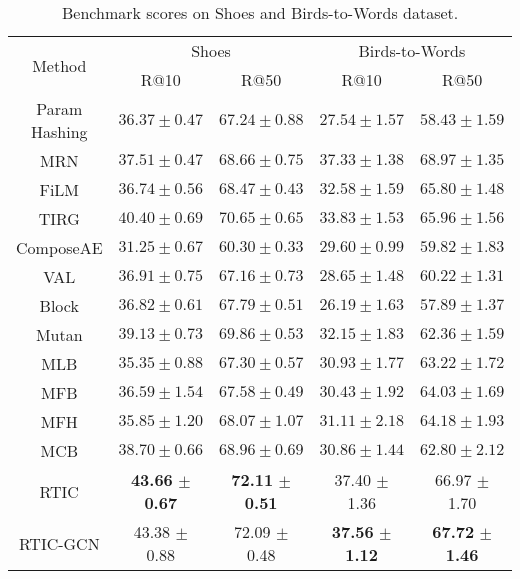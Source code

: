 \documentclass[10pt,twocolumn,letterpaper]{article}
\begin{document}
    
\begin{table}[h]
    \caption{Benchmark scores on Shoes and Birds-to-Words dataset.}
    \centering
    \begin{adjustbox}{width=0.48\textwidth}
    \begin{tabular}{ccccc}
        \toprule
        \multirow{2}{*}{Method} & \multicolumn{2}{c}{Shoes} & \multicolumn{2}{c}{Birds-to-Words} \\ \cline{2-5}
        & R@10 & R@50 & R@10 & R@50 \\
        \hline \hline
        Param Hashing & $ 36.37 \pm  0.47 $ & $ 67.24 \pm 0.88 $ & $ 27.54 \pm 1.57 $ & $ 58.43 \pm 1.59 $ \\
        MRN & $ 37.51 \pm 0.47 $ & $ 68.66 \pm 0.75 $ & $ 37.33 \pm 1.38 $ & $ 68.97 \pm 1.35 $ \\
        FiLM & $ 36.74 \pm 0.56 $ & $ 68.47 \pm 0.43 $ & $ 32.58 \pm 1.59 $ & $ 65.80 \pm 1.48 $ \\
        TIRG & $40.40 \pm 0.69$ & $70.65 \pm 0.65$ & $ 33.83 \pm 1.53 $ & $ 65.96 \pm 1.56 $ \\
        ComposeAE & $ 31.25 \pm 0.67 $ & $ 60.30 \pm 0.33 $ & $ 29.60 \pm 0.99 $ & $ 59.82 \pm 1.83 $ \\
        VAL & $ 36.91 \pm 0.75 $ & $ 67.16 \pm 0.73 $ & $ 28.65 \pm 1.48 $ & $ 60.22 \pm 1.31 $ \\
        \hline
        Block & $ 36.82 \pm 0.61 $ & $ 67.79 \pm 0.51 $ & $ 26.19 \pm 1.63 $ & $ 57.89 \pm 1.37 $ \\
        Mutan & $ 39.13 \pm 0.73 $ & $ 69.86 \pm 0.53 $ & $ 32.15 \pm 1.83 $ & $ 62.36 \pm 1.59 $ \\
        MLB & $ 35.35 \pm 0.88 $ & $ 67.30 \pm 0.57 $ & $ 30.93 \pm 1.77 $ & $ 63.22 \pm 1.72 $ \\
        MFB & $ 36.59 \pm 1.54 $ & $ 67.58 \pm 0.49 $ & $ 30.43 \pm 1.92 $ & $ 64.03 \pm 1.69 $ \\
        MFH & $ 35.85 \pm 1.20 $ & $ 68.07 \pm 1.07 $ & $ 31.11 \pm 2.18 $ & $ 64.18 \pm 1.93 $ \\
        MCB & $ 38.70 \pm 0.66 $ & $ 68.96 \pm 0.69 $ & $ 30.86 \pm 1.44 $ & $ 62.80 \pm 2.12 $ \\
        \hline
        RTIC & \textbf{43.66} $\pm$ \textbf{0.67} & \textbf{72.11} $\pm$ \textbf{0.51} & 37.40 $\pm$ 1.36 & 66.97 $\pm$ 1.70 \\
        RTIC-GCN & 43.38 $\pm$ 0.88 & 72.09 $\pm$ 0.48 & \textbf{37.56} $\pm$ \textbf{1.12} & \textbf{67.72} $\pm$ \textbf{1.46} \\
        \bottomrule
    \end{tabular}
    \end{adjustbox}
    \label{tab:bechmark_shoes_birds}
    \end{table}
\end{document}
